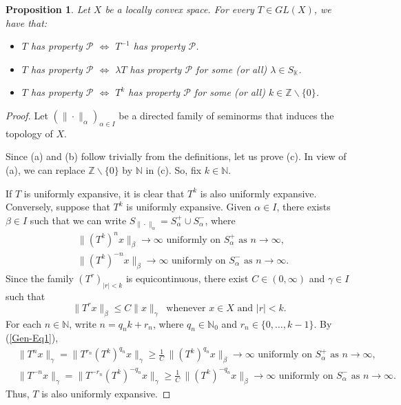 \documentclass[12pt]{amsart}
\theoremstyle{theorem}
\newtheorem{proposition}[theorem]{Proposition}
\theoremstyle{definition}
\theoremstyle{remark} \theoremstyle{question} \theoremstyle{example}
\newcommand{\N}{\mathbb{N}}   %
\newcommand{\Z}{\mathbb{Z}}   %
\newcommand{\K}{\mathbb{K}}   %
\newcommand{\cP}{\mathcal{P}}
\begin{document}
\begin{proposition}\label{Gen-P1}
Let $X$ be a locally convex space. For every $T \in GL(X)$, we have that:
\begin{itemize}
\item [\rm (a)] $T$ has property $\cP$ $\Longleftrightarrow$ $T^{-1}$ has property $\cP$.
\item [\rm (b)] $T$ has property $\cP$ $\Longleftrightarrow$ $\lambda T$ has property $\cP$ for some (or all) $\lambda \in S_\K$.
\item [\rm (c)] $T$ has property $\cP$ $\Longleftrightarrow$ $T^k$ has property $\cP$ for some (or all) $k \in \Z \backslash \{0\}$.
\end{itemize}
\end{proposition}

\begin{proof}
Let $(\|\cdot\|_\alpha)_{\alpha \in I}$ be a directed family of seminorms that induces the topology of $X$.

Since (a) and (b) follow trivially from the definitions, let us prove (c).
In view of (a), we can replace $\Z \backslash \{0\}$ by $\N$ in (c). So, fix $k \in \N$.

If $T$ is uniformly expansive, it is clear that $T^k$ is also uniformly expansive.
Conversely, suppose that $T^k$ is uniformly expansive.
Given $\alpha \in I$, there exists $\beta \in I$ such that we can write $S_{\|\cdot\|_\alpha} = S^+_\alpha \cup S^-_\alpha$, where
\begin{align*}
&\|(T^k)^n x\|_\beta \to \infty \text{ uniformly on } S^+_\alpha \text{ as } n \to \infty,\\
&\|(T^k)^{-n} x\|_\beta \to \infty \text{ uniformly on } S^-_\alpha \text{ as } n \to \infty.
\end{align*}
Since the family $(T^r)_{|r| < k}$ is equicontinuous, there exist $C \in (0,\infty)$ and $\gamma \in I$ such that
\begin{equation}\label{Gen-Eq1}
\|T^r x\|_\beta \leq C \|x\|_\gamma \ \text{ whenever } x \in X \text{ and } |r| < k.
\end{equation}
For each $n \in \N$, write $n = q_n k + r_n$, where $q_n \in \N_0$ and $r_n \in \{0,\ldots,k-1\}$. By (\ref{Gen-Eq1}),
\begin{align*}
&\|T^n x\|_\gamma = \|T^{r_n} (T^k)^{q_n} x\|_\gamma \geq \frac{1}{C}\, \|(T^k)^{q_n} x\|_\beta \to \infty 
  \text{ uniformly on } S^+_\alpha \text{ as } n \to \infty,\\
&\|T^{-n} x\|_\gamma = \|T^{-r_n} (T^k)^{-q_n} x\|_\gamma \geq \frac{1}{C}\, \|(T^k)^{-q_n} x\|_\beta \to \infty 
  \text{ uniformly on } S^-_\alpha \text{ as } n \to \infty.
\end{align*}
Thus, $T$ is also uniformly expansive.


\end{proof}
\end{document}
